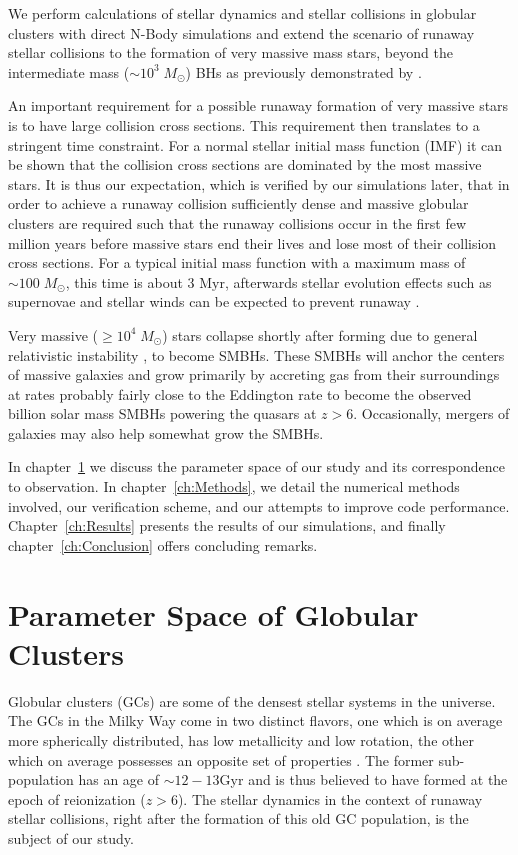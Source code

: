 \documentclass{princeton_astro_thesis}
\newcommand\Msun{\; M_\odot}
\newcommand\msun{\; M_\odot}
\newcommand\Myr{\mbox{ Myr}}
\numberwithin{equation}{section}
\begin{document}
We perform calculations of stellar dynamics and stellar collisions in globular clusters with direct N-Body simulations 
and extend the scenario of runaway stellar collisions to 
the formation of very massive mass stars, beyond the intermediate mass ($\sim 10^3\msun$) BHs 
as previously demonstrated by \citet{2004SPZ}.

An important requirement for a possible runaway formation of very massive stars
is to have large collision cross sections.
This requirement then translates to 
a stringent time constraint.
For a normal stellar initial mass function (IMF)
it can be shown that the collision cross sections are dominated by the most massive stars.
It is thus our expectation, which is verified by our simulations later,
that in order to achieve a runaway collision sufficiently dense and massive globular clusters
are required such that the runaway collisions occur in the first few million years before
massive stars end their lives and lose most of their collision cross sections.
For a typical initial mass function with a maximum mass of $\sim100 \Msun$, this time is about $3 \Myr$, 
afterwards stellar evolution effects such as supernovae and stellar winds can be expected to prevent runaway \citep{2002SPZ}. 

Very massive ($\ge 10^4\msun$) stars collapse shortly after forming due to general relativistic instability \citep{1964Chandrasekhar},
to become SMBHs.
These SMBHs will anchor the centers of massive galaxies 
and grow primarily by accreting gas from their surroundings at rates probably fairly close to the Eddington rate
to become the observed billion solar mass SMBHs powering the quasars at $z>6$.
Occasionally, mergers of galaxies may also help somewhat grow the SMBHs.

In chapter~\ref{ch:Model} we discuss the parameter space of our study and its correspondence to observation.  In chapter~\ref{ch:Methods}, we detail the numerical methods involved, our verification scheme, and our attempts to improve code performance. Chapter~\ref{ch:Results} presents the results of our simulations, and finally chapter~\ref{ch:Conclusion} offers concluding remarks.

\chapter{Parameter Space of Globular Clusters}
\label{ch:Model}

Globular clusters (GCs) are some of the densest stellar systems in the universe. 
The GCs in the Milky Way come in two distinct flavors,
one which is on average more spherically distributed, has low metallicity 
and low rotation, the other which on average possesses an opposite set of properties
\citep[][]{1985Zinn}.
The former sub-population has an age of $\sim 12-13$Gyr and is thus believed
to have formed at the epoch of reionization ($z>6$).
The stellar dynamics in the context of runaway stellar collisions,
right after the formation of this old GC population, is the subject of our study.
\end{document}
